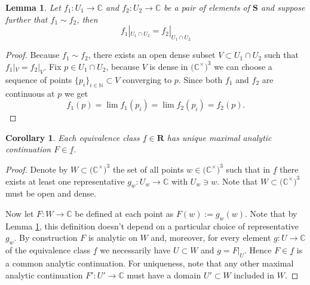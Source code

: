 \documentclass{amsart}
\newtheorem{lemma}[theorem]{Lemma}
\newtheorem{corollary}[theorem]{Corollary}
\begin{document}
\begin{lemma}
Let $f_1:U_1\rightarrow\mathbb C$ and $f_2:U_2\rightarrow\mathbb C$ be a pair of elements of $\mathbf S$ and suppose further that $f_1\sim f_2$, then
\begin{equation*}
f_1|_{U_1\cap U_2}=f_2|_{U_1\cap U_2}
\end{equation*}
\label{lemm:AgrreOnIntersection}
\end{lemma}
\begin{proof}
Because $f_1\sim f_2$, there exists an open dense subset $V\subset U_1\cap U_2$ such that $f_1|_V=f_2|_V$. Fix $p\in U_1\cap U_2$, because $V$ is dense in $\big(\mathbb C^\times\big)^3$ we can choose a sequence of points $\{p_i\}_{i\in\mathbb N}\subset V$ converging to $p$. Since both $f_1$ and $f_2$ are continuous at $p$ we get
\begin{equation*}
f_1(p)=\lim f_1(p_i)=\lim f_2(p_i)=f_2(p).
\end{equation*}
\end{proof}
\begin{corollary}
Each equivalence class $\underline f\in\mathbf R$ has unique maximal analytic continuation $F\in\underline{f}$.
\end{corollary}
\begin{proof}
Denote by $W\subset\big(\mathbb C^\times\big)^3$ the set of all points $w\in\big(\mathbb C^\times\big)^3$ such that in $\underline{f}$ there exists at least one representative $g_w:U_w\rightarrow\mathbb C$ with $U_w\ni w$. Note that $W\subset\big(\mathbb C^\times\big)^3$ must be open and dense.

Now let $F:W\rightarrow\mathbb C$ be defined at each point as $F(w):=g_w(w)$. Note that by Lemma \ref{lemm:AgrreOnIntersection}, this definition doesn't depend on a particular choice of representative $g_w$. By construction $F$ is analytic on $W$ and, moreover, for every element $g:U\rightarrow\mathbb C$ of the equivalence class $\underline{f}$ we necessarily have $U\subset W$ and $g=F|_U$. Hence $F\in\underline{f}$ is a common analytic continuation. For uniqueness, note that any other maximal analytic continuation $F':U'\rightarrow\mathbb C$ must have a domain $U'\subset W$ included in $W$.
\end{proof}
\end{document}
